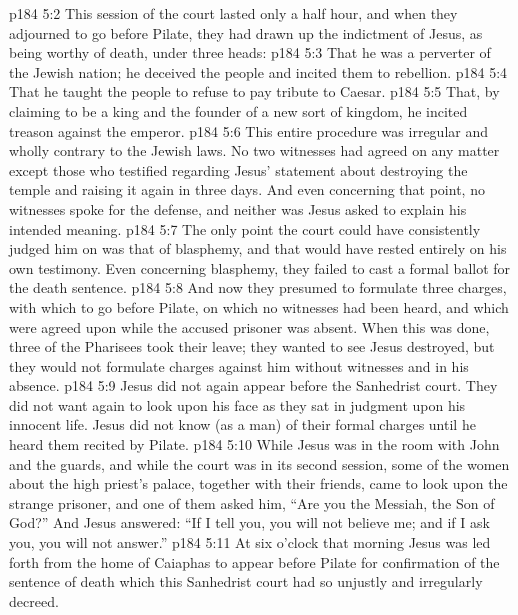\vs p184 5:2 This session of the court lasted only a half hour, and when they adjourned to go before Pilate, they had drawn up the indictment of Jesus, as being worthy of death, under three heads:
\pc \vs p184 5:3 \bibnobreakspace That he was a perverter of the Jewish nation; he deceived the people and incited them to rebellion.
\vs p184 5:4 \bibnobreakspace That he taught the people to refuse to pay tribute to Caesar.
\vs p184 5:5 \bibnobreakspace That, by claiming to be a king and the founder of a new sort of kingdom, he incited treason against the emperor.
\pc \vs p184 5:6 This entire procedure was irregular and wholly contrary to the Jewish laws. No two witnesses had agreed on any matter except those who testified regarding Jesus’ statement about destroying the temple and raising it again in three days. And even concerning that point, no witnesses spoke for the defense, and neither was Jesus asked to explain his intended meaning.
\vs p184 5:7 The only point the court could have consistently judged him on was that of blasphemy, and that would have rested entirely on his own testimony. Even concerning blasphemy, they failed to cast a formal ballot for the death sentence.
\vs p184 5:8 And now they presumed to formulate three charges, with which to go before Pilate, on which no witnesses had been heard, and which were agreed upon while the accused prisoner was absent. When this was done, three of the Pharisees took their leave; they wanted to see Jesus destroyed, but they would not formulate charges against him without witnesses and in his absence.
\vs p184 5:9 Jesus did not again appear before the Sanhedrist court. They did not want again to look upon his face as they sat in judgment upon his innocent life. Jesus did not know (as a man) of their formal charges until he heard them recited by Pilate.\plusone
\pc \vs p184 5:10 While Jesus was in the room with John and the guards, and while the court was in its second session, some of the women about the high priest’s palace, together with their friends, came to look upon the strange prisoner, and one of them asked him, “Are you the Messiah, the Son of God?” And Jesus answered: \textcolor{ubdarkred}{“If I tell you, you will not believe me; and if I ask you, you will not answer.”}
\vs p184 5:11 At six o’clock that morning Jesus was led forth from the home of Caiaphas to appear before Pilate for confirmation of the sentence of death which this Sanhedrist court had so unjustly and irregularly decreed.
